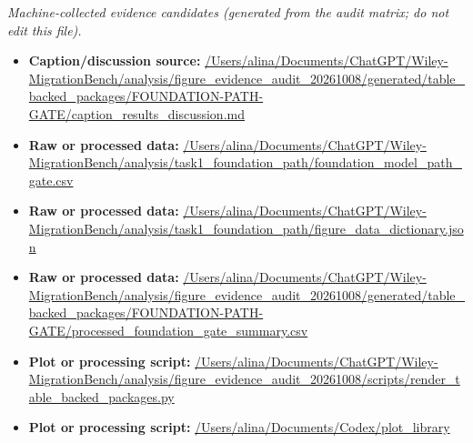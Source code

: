 \emph{Machine-collected evidence candidates (generated from the audit matrix; do not edit this file).}
\begin{itemize}[leftmargin=1.4em,noitemsep]
\item \textbf{Caption/discussion source:} \url{/Users/alina/Documents/ChatGPT/Wiley-MigrationBench/analysis/figure_evidence_audit_20261008/generated/table_backed_packages/FOUNDATION-PATH-GATE/caption_results_discussion.md}
\item \textbf{Raw or processed data:} \url{/Users/alina/Documents/ChatGPT/Wiley-MigrationBench/analysis/task1_foundation_path/foundation_model_path_gate.csv}
\item \textbf{Raw or processed data:} \url{/Users/alina/Documents/ChatGPT/Wiley-MigrationBench/analysis/task1_foundation_path/figure_data_dictionary.json}
\item \textbf{Raw or processed data:} \url{/Users/alina/Documents/ChatGPT/Wiley-MigrationBench/analysis/figure_evidence_audit_20261008/generated/table_backed_packages/FOUNDATION-PATH-GATE/processed_foundation_gate_summary.csv}
\item \textbf{Plot or processing script:} \url{/Users/alina/Documents/ChatGPT/Wiley-MigrationBench/analysis/figure_evidence_audit_20261008/scripts/render_table_backed_packages.py}
\item \textbf{Plot or processing script:} \url{/Users/alina/Documents/Codex/plot_library}
\end{itemize}
